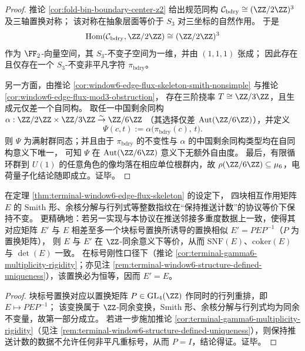 \begin{proof}
推论 \ref{cor:fold-bin-boundary-center-z2} 给出规范同构 \(\mathcal C_{\mathrm{bdry}}\cong(\ZZ/2\ZZ)^3\) 及三轴置换对称；
该对称在抽象层面等价于 \(S_3\) 对三坐标的自然作用。
于是
\[
\mathrm{Hom}(\mathcal C_{\mathrm{bdry}},\ZZ/2\ZZ)\cong(\ZZ/2\ZZ)^3
\]
作为 \(\FF_2\)-向量空间，其 \(S_3\)-不变子空间为一维，并由 \((1,1,1)\) 张成；
因此存在且仅存在一个 \(S_3\)-不变非平凡字符 \(\pi_{\mathrm{bdry}}\)。
\par
另一方面，由推论 \ref{cor:window6-edge-flux-skeleton-smith-nonsimple} 与推论 \ref{cor:window6-edge-flux-mod3-obstruction}，
存在三阶挠率 \(T\cong\ZZ/3\ZZ\)，且生成元仅差一个自同构。
取任一中国剩余同构
\(
\alpha:\ZZ/2\ZZ\times\ZZ/3\ZZ\overset{\sim}{\to}\ZZ/6\ZZ
\)
（其选择仅差 \(\mathrm{Aut}(\ZZ/6\ZZ)\)），并定义
\[
\Psi(c,t):=\alpha\bigl(\pi_{\mathrm{bdry}}(c),\,t\bigr).
\]
则 \(\Psi\) 为满射群同态；并且由于 \(\pi_{\mathrm{bdry}}\) 的不变性与 \(\alpha\) 的中国剩余同构类型均在自同构意义下唯一，
可知 \(\Psi\) 在 \(\mathrm{Aut}(\ZZ/6\ZZ)\) 意义下无额外自由度。
最后，有限循环群到 \(U(1)\) 的任意角色的像均落在相应单位根群内，故 \(\rho(\ZZ/6\ZZ)\subseteq\mu_6\)，电荷量子化结论随即成立。证毕。
\end{proof}

\begin{corollary}\label{cor:window6-edge-flux-arithmetic-protocol-invariant}
在定理 \ref{thm:terminal-window6-edge-flux-skeleton} 的设定下，
四块相互作用矩阵 \(E\) 的 Smith 形、余核分解与行列式等整数指纹在“保持推送计数”的协议等价下保持不变。
更精确地：若另一实现与本协议在推送邻接多重度数据上一致，使得其对应矩阵 \(E'\) 与 \(E\) 相差至多一个块标号置换所诱导的置换相似 \(E'=PEP^{-1}\)（\(P\) 为置换矩阵），
则 \(E\) 与 \(E'\) 在 \(\ZZ\)-同余意义下等价，从而 \(\mathrm{SNF}(E)\)、\(\mathrm{coker}(E)\) 与 \(\det(E)\) 一致。
在标号刚性口径下（推论 \ref{cor:terminal-gamma6-multiplicity-rigidity}；亦见注 \ref{rem:terminal-window6-structure-defined-uniqueness}），该置换必为恒等，因而 \(E'=E\)。
\end{corollary}
\begin{proof}
块标号置换对应以置换矩阵 \(P\in\mathrm{GL}_4(\ZZ)\) 作同时的行列重排，即 \(E\mapsto PEP^{-1}\)；
该变换属于 \(\ZZ\)-同余变换，Smith 形、余核分解与行列式均为同余不变量，故第一部分成立。
若进一步施加推论 \ref{cor:terminal-gamma6-multiplicity-rigidity}（见注 \ref{rem:terminal-window6-structure-defined-uniqueness}），则保持推送计数的数据不允许任何非平凡重标号，从而 \(P=I\)，结论得证。证毕。
\end{proof}

